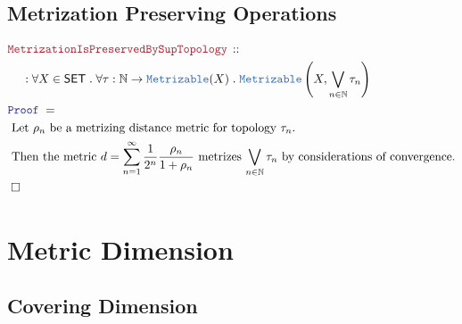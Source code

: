 \documentclass[12pt]{scrartcl}
\newcommand{\TYPE}[1]{\textcolor{NavyBlue}{\mathtt{#1}}}
\newcommand{\LOGIC}[1]{\textcolor{Blue}{\mathtt{#1}}}
\newcommand{\THM}[1]{\textcolor{Maroon}{\mathtt{#1}}}
\renewcommand{\.}{\; . \;}
\newcommand{\Theorem}[2]{& \THM{#1} \, :: \, #2 \\ & \Proof = \\ }
\newcommand{\NewLine}{\\ & \kern 1pc}
\newcommand{\Page}[1]{ \begin{align*} #1 \end{align*}   }
\newcommand{\Explain}[1]{& \text{#1.} \\}
\newcommand{\Nat}{\mathbb{N} }
\newcommand{\QED}{\; \square}
\newcommand{\EndProof}{& \QED \\}
\newcommand{\Proof}{\LOGIC{Proof} \; }
\newcommand{\SET}{\mathsf{SET}}
\newcommand{\Mable}{\TYPE{Metrizable}}
\begin{document}
\subsection{Metrization Preserving Operations}
\Page{
	\Theorem{MetrizationIsPreservedBySupTopology}
	{
		\NewLine :		
		\forall  X \in \SET \.
		\forall \tau : \Nat \to \Mable(X) \.
		\Mable\left(X, \bigvee_{n \in \Nat} \tau_n \right) 
	}
	\Explain{
		Let $\rho_n$ be a metrizing distance metric for topology $\tau_n$}
	\Explain{
		Then the metric $d = \sum^\infty_{n=1} \frac{1}{2^n} \frac{\rho_n}{1 + \rho_n}$
		metrizes $\bigvee_{n \in \Nat} \tau_n$ by considerations of convergence}
	\EndProof
}
\newpage
\section{Metric Dimension}
\subsection{Covering Dimension}
\end{document}
